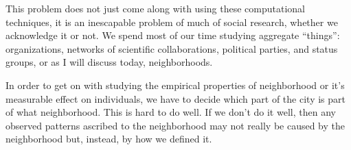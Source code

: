 { %
  \begin{frame}[plain]
  \end{frame}
}

This problem does not just come along with using these computational
techniques, it is an inescapable problem of much of social research,
whether we acknowledge it or not. We spend most of our time studying
aggregate ``things'': organizations, networks of scientific
collaborations, political parties, and status groups, or as I will
discuss today, neighborhoods.

In order to get on with studying the empirical properties of
neighborhood or it's measurable effect on individuals, we have to
decide which part of the city is part of what neighborhood. This is
hard to do well. If we don't do it well, then any observed patterns
ascribed to the neighborhood may not really be caused by the
neighborhood but, instead, by how we defined it.










